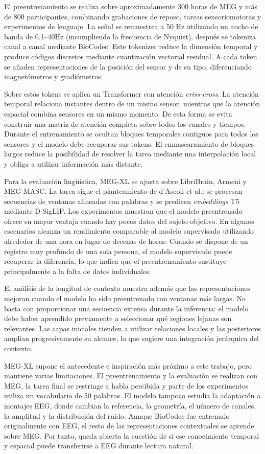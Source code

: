 El preentrenamiento se realiza sobre aproximadamente 300 horas de MEG y más de 800 participantes, combinando grabaciones de reposo, tareas sensoriomotoras y experimentos de lenguaje. La señal se remuestrea a 50 Hz utilizando un ancho de banda de 0.1--40Hz (incumpliendo la frecuencia de Nyquist), después se tokeniza canal a canal mediante BioCodec. Este tokenizer reduce la dimensión temporal y produce códigos discretos mediante cuantización vectorial residual. A cada token se añaden representaciones de la posición del sensor y de su tipo, diferenciando magnetómetros y gradiómetros.

Sobre estos tokens se aplica un Transformer con atención \textit{criss-cross}. La atención temporal relaciona instantes dentro de un mismo sensor, mientras que la atención espacial combina sensores en un mismo momento. De esta forma se evita construir una matriz de atención completa sobre todos los canales y tiempos. Durante el entrenamiento se ocultan bloques temporales contiguos para todos los sensores y el modelo debe recuperar sus tokens. El enmascaramiento de bloques largos reduce la posibilidad de resolver la tarea mediante una interpolación local y obliga a utilizar información más distante.

Para la evaluación lingüística, MEG-XL se ajusta sobre LibriBrain, Armeni y MEG-MASC. La tarea sigue el planteamiento de d'Ascoli et al.: se procesan secuencias de ventanas alineadas con palabras y se predicen \textit{embeddings} T5 mediante D-SigLIP. Los experimentos muestran que el modelo preentrenado ofrece su mayor ventaja cuando hay pocos datos del sujeto objetivo. En algunos escenarios alcanza un rendimiento comparable al modelo supervisado utilizando alrededor de una hora en lugar de decenas de horas. Cuando se dispone de un registro muy profundo de una sola persona, el modelo supervisado puede recuperar la diferencia, lo que indica que el preentrenamiento sustituye principalmente a la falta de datos individuales.

El análisis de la longitud de contexto muestra además que las representaciones mejoran cuando el modelo ha sido preentrenado con ventanas más largas. No basta con proporcionar una secuencia extensa durante la inferencia: el modelo debe haber aprendido previamente a seleccionar qué regiones lejanas son relevantes. Las capas iniciales tienden a utilizar relaciones locales y las posteriores amplían progresivamente su alcance, lo que sugiere una integración jerárquica del contexto.

MEG-XL supone el antecedente e inspiración más próximo a este trabajo, pero mantiene varias limitaciones. El preentrenamiento y la evaluación se realizan con MEG, la tarea final se restringe a habla percibida y parte de los experimentos utiliza un vocabulario de 50 palabras. El modelo tampoco estudia la adaptación a montajes EEG, donde cambian la referencia, la geometría, el número de canales, la amplitud y la distribución del ruido. Aunque BioCodec fue entrenado originalmente con EEG, el resto de las representaciones contextuales se aprende sobre MEG. Por tanto, queda abierta la cuestión de si ese conocimiento temporal y espacial puede transferirse a EEG durante lectura natural.


